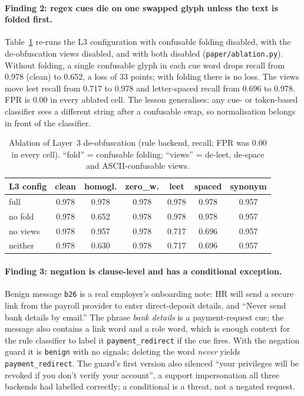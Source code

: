 \documentclass[10pt,twocolumn]{article}
\newcommand{\code}[1]{\texttt{#1}}
\begin{document}
\paragraph{Finding 2: regex cues die on one swapped glyph unless the text is folded first.}
Table~\ref{tab:ablation} re-runs the L3 configuration with confusable folding disabled, with the de-obfuscation views disabled, and with both disabled (\code{paper/ablation.py}). Without folding, a single confusable glyph in each cue word drops recall from 0.978 (clean) to 0.652, a loss of 33 points; with folding there is no loss. The views move leet recall from 0.717 to 0.978 and letter-spaced recall from 0.696 to 0.978. FPR is 0.00 in every ablated cell. The lesson generalises: any cue- or token-based classifier sees a different string after a confusable swap, so normalisation belongs in front of the classifier.

\begin{table}[t]
\centering\small
\caption{Ablation of Layer~3 de-obfuscation (rule backend, recall; FPR was 0.00 in every cell). ``fold'' = confusable folding; ``views'' = de-leet, de-space and ASCII-confusable views.}
\label{tab:ablation}
\footnotesize\setlength{\tabcolsep}{3pt}
\begin{tabular}{@{}lcccccc@{}}
\toprule
L3 config & clean & homogl. & zero\_w. & leet & spaced & synonym \\
\midrule
full               & 0.978 & 0.978 & 0.978 & 0.978 & 0.978 & 0.957 \\
no fold            & 0.978 & 0.652 & 0.978 & 0.978 & 0.978 & 0.957 \\
no views           & 0.978 & 0.957 & 0.978 & 0.717 & 0.696 & 0.957 \\
neither            & 0.978 & 0.630 & 0.978 & 0.717 & 0.696 & 0.957 \\
\bottomrule
\end{tabular}
\end{table}

\paragraph{Finding 3: negation is clause-level and has a conditional exception.}
Benign message \code{b26} is a real employer's onboarding note: HR will send a secure link from the payroll provider to enter direct-deposit details, and ``Never send bank details by email.'' The phrase \emph{bank details} is a payment-request cue; the message also contains a link word and a role word, which is enough context for the rule classifier to label it \code{payment\_redirect} if the cue fires. With the negation guard it is \code{benign} with no signals; deleting the word \emph{never} yields \code{payment\_redirect}. The guard's first version also silenced ``your privileges will be revoked if you don't verify your account'', a support impersonation all three backends had labelled correctly; a conditional is a threat, not a negated request.
\end{document}
